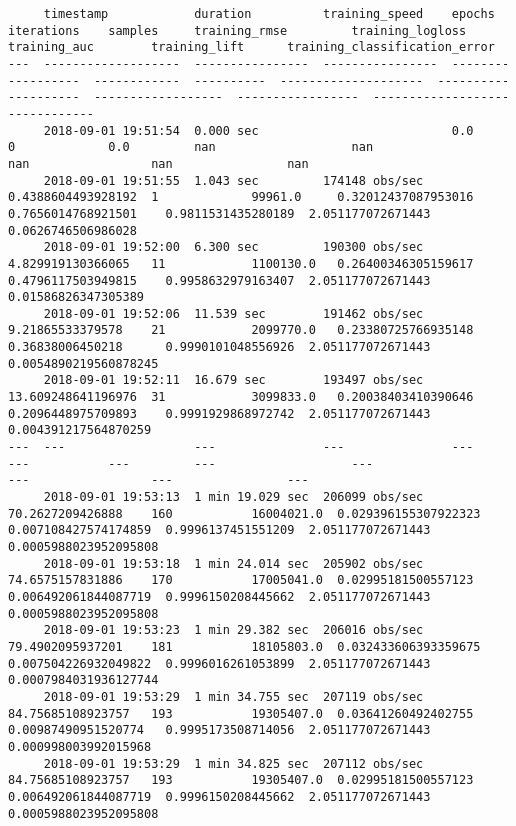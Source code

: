 \documentclass[11pt]{article}
\begin{document}
    
    \begin{verbatim}
     timestamp            duration          training_speed    epochs              iterations    samples     training_rmse         training_logloss      training_auc        training_lift      training_classification_error
---  -------------------  ----------------  ----------------  ------------------  ------------  ----------  --------------------  --------------------  ------------------  -----------------  -------------------------------
     2018-09-01 19:51:54  0.000 sec                           0.0                 0             0.0         nan                   nan                   nan                 nan                nan
     2018-09-01 19:51:55  1.043 sec         174148 obs/sec    0.4388604493928192  1             99961.0     0.32012437087953016   0.7656014768921501    0.9811531435280189  2.051177072671443  0.0626746506986028
     2018-09-01 19:52:00  6.300 sec         190300 obs/sec    4.829919130366065   11            1100130.0   0.26400346305159617   0.4796117503949815    0.9958632979163407  2.051177072671443  0.01586826347305389
     2018-09-01 19:52:06  11.539 sec        191462 obs/sec    9.21865533379578    21            2099770.0   0.23380725766935148   0.36838006450218      0.9990101048556926  2.051177072671443  0.0054890219560878245
     2018-09-01 19:52:11  16.679 sec        193497 obs/sec    13.609248641196976  31            3099833.0   0.20038403410390646   0.2096448975709893    0.9991929868972742  2.051177072671443  0.004391217564870259
---  ---                  ---               ---               ---                 ---           ---         ---                   ---                   ---                 ---                ---
     2018-09-01 19:53:13  1 min 19.029 sec  206099 obs/sec    70.2627209426888    160           16004021.0  0.029396155307922323  0.007108427574174859  0.9996137451551209  2.051177072671443  0.0005988023952095808
     2018-09-01 19:53:18  1 min 24.014 sec  205902 obs/sec    74.6575157831886    170           17005041.0  0.02995181500557123   0.006492061844087719  0.9996150208445662  2.051177072671443  0.0005988023952095808
     2018-09-01 19:53:23  1 min 29.382 sec  206016 obs/sec    79.4902095937201    181           18105803.0  0.032433606393359675  0.007504226932049822  0.9996016261053899  2.051177072671443  0.0007984031936127744
     2018-09-01 19:53:29  1 min 34.755 sec  207119 obs/sec    84.75685108923757   193           19305407.0  0.03641260492402755   0.00987490951520774   0.9995173508714056  2.051177072671443  0.000998003992015968
     2018-09-01 19:53:29  1 min 34.825 sec  207112 obs/sec    84.75685108923757   193           19305407.0  0.02995181500557123   0.006492061844087719  0.9996150208445662  2.051177072671443  0.0005988023952095808
    \end{verbatim}
\end{document}
